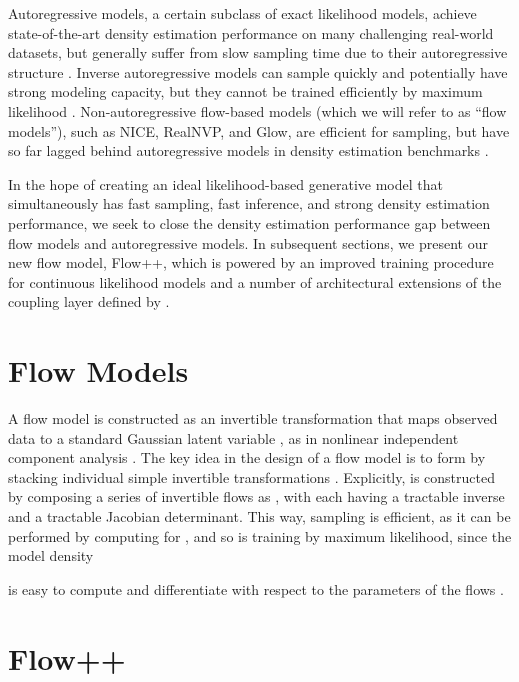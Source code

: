 \documentclass{article}
\begin{document}
Autoregressive models, a certain subclass of exact likelihood models, achieve state-of-the-art density estimation performance on many challenging real-world datasets, but generally suffer from slow sampling time due to their autoregressive structure \citep{oord2016pixel,salimans2017pixelcnn++,chen2017pixelsnail, parmar2018image}. Inverse autoregressive models can sample quickly and potentially have strong modeling capacity, but they cannot be trained efficiently by maximum likelihood \citep{kingma2016improving}. Non-autoregressive flow-based models (which we will refer to as ``flow models''), such as NICE, RealNVP, and Glow, are efficient for sampling, but have so far lagged behind autoregressive models in density estimation benchmarks \citep{dinh2014nice,dinh2016density,kingma2018glow}.

In the hope of creating an ideal likelihood-based generative model that simultaneously has fast sampling, fast inference, and strong density estimation performance, we seek to close the density estimation performance gap between flow models and autoregressive models. In subsequent sections, we present our new flow model, Flow++, which is powered by an improved training procedure for continuous likelihood models and a number of architectural extensions of the coupling layer defined by \citet{dinh2014nice,dinh2016density}.

\section{Flow Models}

A flow model  is constructed as an invertible transformation that maps observed data  to a standard Gaussian latent variable , as in nonlinear independent component analysis \citep{bell1995information, hyvarinen2004independent, hyvarinen1999nonlinear}.
The key idea in the design of a flow model is to form  by stacking individual simple invertible transformations \citep{dinh2014nice,dinh2016density,kingma2018glow,rezende2015variational, kingma2016improving, louizos2017multiplicative}. Explicitly,  is constructed by composing a series of invertible flows as , with each  having a tractable inverse and a tractable Jacobian determinant. This way, sampling is efficient, as it can be performed by computing  for , and so is training by maximum likelihood, since the model density

is easy to compute and differentiate with respect to the parameters of the flows .

\section{Flow++}
\label{sec:flowpp}
\end{document}
